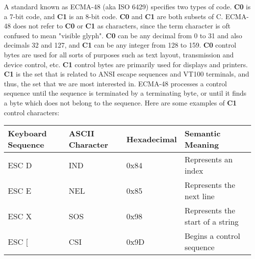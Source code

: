 \documentclass{article}
\begin{document}
A standard known as ECMA-48 (aka ISO 6429) specifies two types of code. \textbf{C0} is a 7-bit code, and
\textbf{C1} is an 8-bit code. \textbf{C0} and \textbf{C1} are both subsets of C. ECMA-48 does not refer to
\textbf{C0} or \textbf{C1} as characters, since the term character is oft confused to mean "visible glyph".
\textbf{C0} can be any decimal from 0 to 31 and also decimals 32 and 127, and \textbf{C1} can be any integer
from 128 to 159. \textbf{C0} control bytes are used for all sorts of purposes such as text layout, transmission
and device control, etc. \textbf{C1} control bytes are primarily used for displays and printers. \textbf{C1}
is the set that is related to ANSI escape sequences and VT100 terminals, and thus, the set that we are most
interested in. ECMA-48 processes a control sequence until the sequence is terminated by a terminating byte, or
until it finds a byte which does not belong to the sequence. Here are some examples of \textbf{C1} control
characters:

\begin{center}
    \begin{tabularx}{\textwidth}{
            | >{\centering\arraybackslash}X
            | >{\centering\arraybackslash}X
            | >{\centering\arraybackslash}X
            | >{\centering\arraybackslash}X |}
        \hline
        Keyboard Sequence & ASCII Character & Hexadecimal & Semantic Meaning \\
        \hline
        ESC D & IND & 0x84 & Represents an index \\
        \hline
        ESC E & NEL & 0x85 & Represents the next line \\
        \hline
        ESC X & SOS & 0x98 & Represents the start of a string \\
        \hline
        ESC [ & CSI & 0x9D & Begins a control sequence \\
        \hline
    \end{tabularx}
\end{center}
\end{document}
